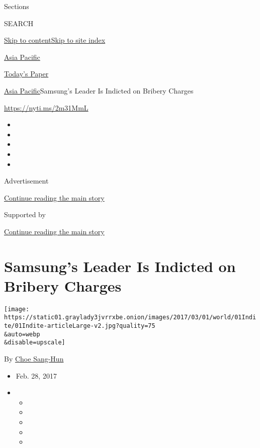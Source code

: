 Sections

SEARCH

\protect\hyperlink{site-content}{Skip to
content}\protect\hyperlink{site-index}{Skip to site index}

\href{https://www.nytimes3xbfgragh.onion/section/world/asia}{Asia
Pacific}

\href{https://myaccount.nytimes3xbfgragh.onion/auth/login?response_type=cookie\&client_id=vi}{}

\href{https://www.nytimes3xbfgragh.onion/section/todayspaper}{Today's
Paper}

\href{/section/world/asia}{Asia Pacific}\textbar{}Samsung's Leader Is
Indicted on Bribery Charges

\url{https://nyti.ms/2m31MmL}

\begin{itemize}
\item
\item
\item
\item
\item
\end{itemize}

Advertisement

\protect\hyperlink{after-top}{Continue reading the main story}

Supported by

\protect\hyperlink{after-sponsor}{Continue reading the main story}

\hypertarget{samsungs-leader-is-indicted-on-bribery-charges}{%
\section{Samsung's Leader Is Indicted on Bribery
Charges}\label{samsungs-leader-is-indicted-on-bribery-charges}}

\texttt{[image: https://static01.graylady3jvrrxbe.onion/images/2017/03/01/world/01Indite/01Indite-articleLarge-v2.jpg?quality=75\\\&auto=webp\\\&disable=upscale]}

By \href{http://www.nytimes3xbfgragh.onion/by/choe-sang-hun}{Choe
Sang-Hun}

\begin{itemize}
\item
  Feb. 28, 2017
\item
  \begin{itemize}
  \item
  \item
  \item
  \item
  \item
  \end{itemize}
\end{itemize}


